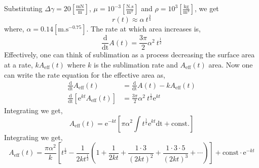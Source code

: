 \documentclass[12pt]{article}
\begin{document}
Substituting $\Delta \gamma = 20 \left[\mathrm{\frac{mN}{m}}\right]$, $\mu = 10^{-3} \left[\mathrm{\frac{N.s}{m^2}}\right]$ and $\rho = 10^3 \left[\mathrm{\frac{kg}{m^3}}\right]$, we get
\begin{equation*}
r(t) \approx \alpha \ t^{\frac{3}{4}}
\end{equation*}
where, $\alpha = 0.14 \left[\mathrm{m.s^{-0.75}}\right]$. The rate at which area increases is, 
\begin{equation*}
\frac{\mathrm{d}}{\mathrm{dt}}A(t) = \frac{3\pi}{2}\alpha^{2}\ t^{\frac{1}{2}}
\end{equation*}
Effectively, one can think of sublimation as a process decreasing the surface area at a rate, $kA_{\mathrm{eff}}(t)$ where $k$ is the sublimation rate and $A_{\mathrm{eff}}(t)$ area.
Now one can write the rate equation for the effective area as,
\begin{align*}
\frac{\mathrm{d}}{\mathrm{dt}}A_{\mathrm{eff}}(t) &= \frac{\mathrm{d}}{\mathrm{dt}}A(t) - kA_{\mathrm{eff}}(t) \\
\frac{\mathrm{d}}{\mathrm{dt}}\left[\mathrm{e}^{kt}A_{\mathrm{eff}}(t)\right] &= \frac{3\pi}{2}\alpha^{2}\ t^{\frac{1}{2}}\mathrm{e}^{kt}
\end{align*}
Integrating we get,
\begin{equation*}
A_{\mathrm{eff}}(t) = \mathrm{e}^{-kt} \left[ \pi \alpha^{2} \int t^{\frac{1}{2}}\mathrm{e}^{kt} \mathrm{dt} + \mathrm{const.}\right]
\end{equation*}
Integrating we get, 
\begin{equation}\label{eq:rsub}
A_{\mathrm{eff}}(t) = \frac{\pi \alpha^{2}}{k} \left[t^{\frac{1}{2}}-\frac{1}{2kt^{\frac{1}{2}}}\left(1 + \frac{1}{2kt} + \frac{1\cdot 3}{(2kt)^2} + \frac{1\cdot 3 \cdot 5}{(2kt)^3} + \cdots \right)\right] + \mathrm{const} \cdot \mathrm{e}^{-kt} 
\end{equation}
\end{document}
